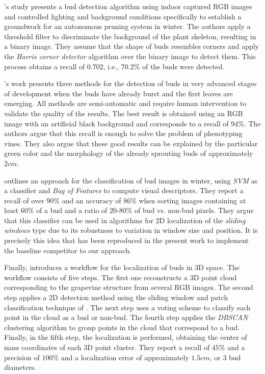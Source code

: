 \documentclass[a4paper,authoryear,review]{elsarticle}
\begin{document}
\citet{xu2014detection}’s study presents a bud detection algorithm using indoor captured RGB images and controlled lighting and background conditions specifically to establish a groundwork for an autonomous pruning system in winter. The authors apply a threshold filter to discriminate the background of the plant skeleton, resulting in a binary image. They assume that the shape of buds resembles corners and apply the \emph{Harris corner detector} algorithm over the binary image to detect them. This process obtains a recall of $0.702$, i.e., $70.2\%$ of the buds were detected. 

\citet{herzog2014initial}’s work presents three methods for the detection of buds in very advanced stages of development when the buds have already burst and the first leaves are emerging. All methods are semi-automatic and require human intervention to validate the quality of the results. The best result is obtained using an RGB image with an artificial black background and corresponds to a recall of $94\%$. The authors argue that this recall is enough to solve the problem of phenotyping vines. They also argue that these good results can be explained by the particular green color and the morphology of the already sprouting buds of approximately $2cm$. 

\citet{perez2017image} outlines an approach for the classification of bud images in winter, using \emph{SVM} as a classifier and \emph{Bag of Features} to compute visual descriptors. They report a recall of over $90\%$ and an accuracy of $86\%$ when sorting images containing at least $60\%$ of a bud and a ratio of $20$-$80\%$ of bud vs. non-bud pixels. They argue that this classifier can be used in algorithms for 2D localization of the \emph{sliding windows} type due to its robustness to variation in window size and position. It is precisely this idea that has been reproduced in the present work to implement the baseline competitor to our approach.

Finally, \citet{diaz2018grapevine} introduces a workflow for the localization of buds in 3D space. The workflow consists of five steps. The first one reconstructs a 3D point cloud corresponding to the grapevine structure from several RGB images. The second step applies a 2D detection method using the sliding window and patch classification technique of \citet{perez2017image}. The next step uses a voting scheme to classify each point in the cloud as a bud or non-bud. The fourth step applies the \emph{DBSCAN} clustering algorithm to group points in the cloud that correspond to a bud. Finally, in the fifth step, the localization is performed, obtaining the center of mass coordinates of each 3D point cluster. They report a recall of $45\%$ and a precision of $100\%$ and a localization error of approximately $1.5cm$, or 3 bud diameters. 
\end{document}
